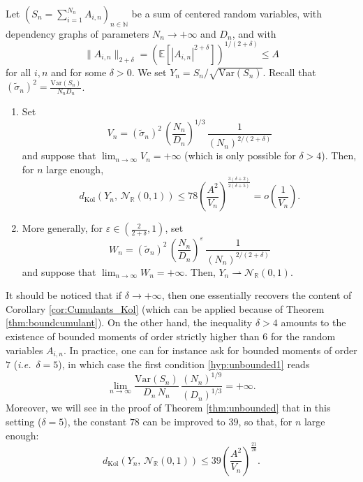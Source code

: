 \documentclass[envcountsame]{svmult}
\newcommand{\N}{\mathbb{N}}
\newcommand{\R}{\mathbb{R}}
\newcommand{\esper}{\mathbb{E}}
\newcommand{\dkol}{d_\mathrm{Kol}}
\newcommand{\eps}{\varepsilon}
\newcommand{\var}{\mathrm{Var}}
\newcommand{\gauss}{\mathcal{N}_{\R}(0,1)}
\begin{document}
\begin{theorem}\label{thm:unbounded}
Let $(S_n = \sum_{i=1}^{N_n} A_{i,n})_{n \in \N}$ be a sum of centered random variables, with dependency graphs of parameters $N_n \to +\infty$ and $D_n$, and with
$$\|A_{i,n}\|_{2+\delta}=(\esper[|A_{i,n}|^{2+\delta}])^{1/(2+\delta)} \leq A$$ 
for all $i,n$ and for some $\delta>0$. 
We set $Y_n = S_n/\sqrt{\var(S_n)}$. Recall that 
$(\widetilde{\sigma}_n)^2 = \frac{\var(S_n)}{N_n D_n}$.
\begin{enumerate}[label=(U\arabic*)]
	\item\label{hyp:unbounded1} Set
      \[ V_n=(\widetilde{\sigma}_n)^2\,\left(\frac{N_n}{D_n}\right)^{\!1/3} \,\frac{1}{(N_n)^{2/(2+\delta)}}\]
      and suppose that $\lim_{n \to \infty} V_n= +\infty$ 
	(which is only possible for $\delta > 4$). Then, for $n$ large enough,
	$$\dkol(Y_n,\,\gauss) \leq 78\left(\frac{A^2}{V_n}\right)^{\!\frac{3(\delta+2)}{2(\delta+5)}}=o\!\left(\frac{1}{V_n}\right).$$
  \item\label{hyp:unbounded2} More generally, for $\eps \in (\frac{2}{2+\delta},1)$,
    set
     \[W_n=(\widetilde{\sigma}_n)^2\,\left(\frac{N_n}{D_n}\right)^{\!\eps} \,\frac{1}{(N_n)^{2/(2+\delta)}}\]
     and suppose that $\lim_{n \to \infty} W_n= +\infty$.
      Then, $Y_n \rightharpoonup \gauss$.
\end{enumerate}
\end{theorem}

\begin{remark}
It should be noticed that if $\delta \to +\infty$, then one essentially recovers the content of Corollary \ref{cor:Cumulants_Kol}
(which can be applied because of Theorem \ref{thm:boundcumulant}).
On the other hand, the inequality $\delta > 4$ amounts to the existence of bounded moments of order strictly higher than $6$ for the random variables $A_{i,n}$. In practice, one can for instance ask for bounded moments of order $7$
(\emph{i.e.}~$\delta=5$), in which case the first condition \ref{hyp:unbounded1} reads
$$\lim_{n \to \infty} \frac{\var(S_n)}{D_n\,N_n} \, \frac{(N_n)^{1/9}}{(D_n)^{1/3}} = +\infty.$$
Moreover, we will see in the proof of Theorem \ref{thm:unbounded} that in this setting ($\delta=5$), the constant $78$ can be improved to $39$, so that, for $n$ large enough:
$$\dkol(Y_n,\,\gauss)\leq 39\left(\frac{A^2}{V_n}\right)^{\frac{21}{20}}.$$
\end{remark}
\end{document}
